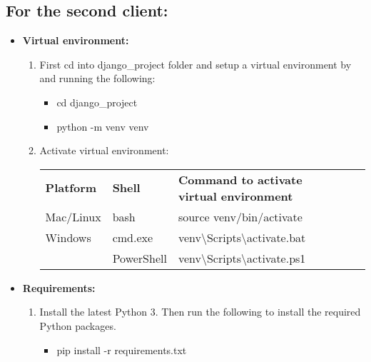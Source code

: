 \documentclass{article}
\begin{document}
\subsection*{For the second client:}
\begin{itemize}
    \item \textbf{Virtual environment: }

    \begin{enumerate}
        \item First cd into django\_project folder and setup a virtual environment by and running the following:

            
        \begin{itemize}
            \item cd django\_project
            \item  python -m venv venv
        \end{itemize}

        \item Activate virtual environment:   
        \begin{table}[h]
            \begin{tabular}{|l|l|l|ll}
            \cline{1-3}
            \textbf{Platform} & \textbf{Shell} & \textbf{Command to activate virtual environment}        &     &  \\ \cline{1-3}
            Mac/Linux         & bash           & source venv/bin/activate                                &  &  \\ \cline{1-3}
            Windows           & cmd.exe        & venv\textbackslash{}Scripts\textbackslash{}activate.bat &  &  \\ \cline{1-3}
                          & PowerShell     & venv\textbackslash{}Scripts\textbackslash{}activate.ps1 &  &  \\ \cline{1-3}
            \end{tabular}
        \end{table}
    \end{enumerate}                                           
            
    
    \item \textbf{Requirements: } 
    \begin{enumerate}
        \item Install the latest Python 3.
        Then run the following to install the required Python packages.
        
        \begin{itemize}
        \item pip install -r requirements.txt
        \end{itemize}


\end{enumerate}
\end{itemize}
\end{document}
